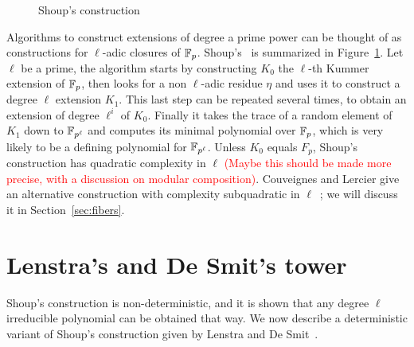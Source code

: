\documentclass{sig-alternate}
\newcommand{\todo}[1]{\textcolor{red}{(#1)}}
\begin{document}
\begin{figure}
  \centering
  \caption{Shoup's construction}
  \label{fig:shoup}
\end{figure}

Algorithms to construct extensions of degree a prime power can be
thought of as constructions for $\ell$-adic closures of
$\mathbb{F}_p$. Shoup's~\cite{shoup94} is summarized in
Figure~\ref{fig:shoup}. Let $\ell$ be a prime, the algorithm starts by
constructing $K_0$ the $\ell$-th Kummer extension of $\mathbb{F}_p$, then
looks for a non $\ell$-adic residue $\eta$ and uses it to construct a
degree $\ell$ extension $K_1$. This last step can be repeated several
times, to obtain an extension of degree $\ell^i$ of $K_0$. Finally it
takes the trace of a random element of $K_1$ down to $\mathbb{F}_{p^\ell}$ and
computes its minimal polynomial over $\mathbb{F}_p$, which is very likely to
be a defining polynomial for $\mathbb{F}_{p^\ell}$. Unless $K_0$ equals $F_p$,
Shoup's construction has quadratic complexity in $\ell$ \todo{Maybe
  this should be made more precise, with a discussion on modular
  composition}.  Couveignes and Lercier give an alternative
construction with complexity subquadratic in
$\ell$~\cite{couveignes+lercier11}; we will discuss it in
Section~\ref{sec:fibers}.



\section{Lenstra's and De Smit's tower}
\label{sec:LDtower}

Shoup's construction is non-deterministic, and it is shown that any
degree $\ell$ irreducible polynomial can be obtained that way. We now
describe a deterministic variant of Shoup's construction given by
Lenstra and De Smit~\cite{lenstra+desmit08-stdmodels}.
\end{document}
